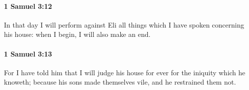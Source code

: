 		\paragraph{1 Samuel 3:12} %
			\label{1SAMUEL-3-12}

			In that day I will perform against Eli all things which I have spoken concerning his house: when I begin, I will also make an end.


		\paragraph{1 Samuel 3:13} %
			\label{1SAMUEL-3-13}

			For I have told him that I will judge his house for ever for the iniquity which he knoweth; because his sons made themselves vile, and he restrained them not.


